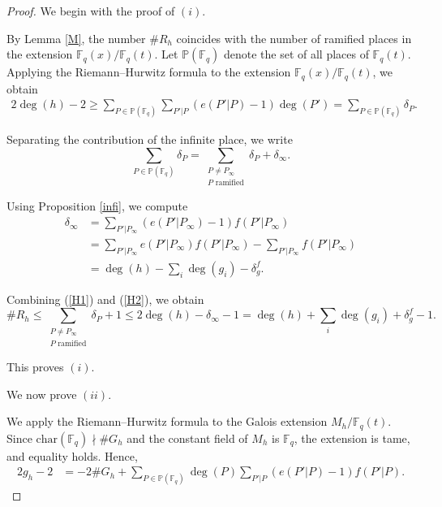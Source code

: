 \documentclass[1p,final]{elsarticle}
\newtheorem{open problem}[theorem]{Open Problem}
\begin{document}
\begin{proof}
We begin with the proof of $(i)$.

\medskip

By Lemma \ref{M}, the number $\#R_{h}$ coincides with the number of ramified places in the extension $\mathbb{F}_q(x)/\mathbb{F}_q(t)$. Let $\mathbb{P}(\mathbb{F}_{q})$ denote the set of all places of $\mathbb{F}_{q}(t)$. Applying the Riemann--Hurwitz formula to the extension $\mathbb{F}_q(x)/\mathbb{F}_q(t)$, we obtain
\begin{equation}\label{H1}
\begin{aligned}
2\deg(h)-2
\ge
\sum_{P\in \mathbb{P}(\mathbb{F}_{q}) }\sum_{P'|P}(e(P'|P)-1)\deg(P')
=
\sum_{P\in \mathbb{P}(\mathbb{F}_{q}) }\delta_{P}.
\end{aligned}
\end{equation}

Separating the contribution of the infinite place, we write
\[
\sum_{P\in \mathbb{P}(\mathbb{F}_{q}) }\delta_{P}
=
\sum_{\substack{P\ne P_{\infty} \\ \text{$P$ ramified}}} \delta_{P}
+
\delta_{\infty}.
\]

Using Proposition \ref{infi}, we compute
\begin{equation}\label{H2}
\begin{aligned}
\delta_{\infty}
&=
\sum_{P'|P_{\infty}}(e(P'|P_{\infty})-1)f(P'|P_{\infty}) \\
&=
\sum_{P'|P_{\infty}}e(P'|P_{\infty})f(P'|P_{\infty})
-
\sum_{P'|P_{\infty}}f(P'|P_{\infty}) \\
&=
\deg(h)-\sum_{i}\deg(g_{i})-\delta_{g}^{f}.
\end{aligned}
\end{equation}

Combining (\ref{H1}) and (\ref{H2}), we obtain
\[
\#R_{h}
\le
\sum_{\substack{P\ne P_{\infty} \\ \text{$P$ ramified}}} \delta_{P}+1
\le
2\deg(h)-\delta_{\infty}-1
=
\deg(h)+\sum_{i}\deg(g_{i})+\delta_{g}^{f}-1.
\]

This proves $(i)$.

\medskip

We now prove $(ii)$.

\medskip

We apply the Riemann--Hurwitz formula to the Galois extension $M_{h}/\mathbb{F}_q(t)$. Since $\text{char}(\mathbb{F}_{q})\nmid \#G_{h}$ and the constant field of $M_{h}$ is $\mathbb{F}_{q}$, the extension is tame, and equality holds. Hence,
\begin{equation}\label{ii1}
\begin{aligned}
2g_{h}-2
&=
-2\#G_{h}
+
\sum_{P\in \mathbb{P}(\mathbb{F}_{q}) }\deg(P)\sum_{P'|P}(e(P'|P)-1)f(P'|P).
\end{aligned}
\end{equation}


\end{proof}
\end{document}

